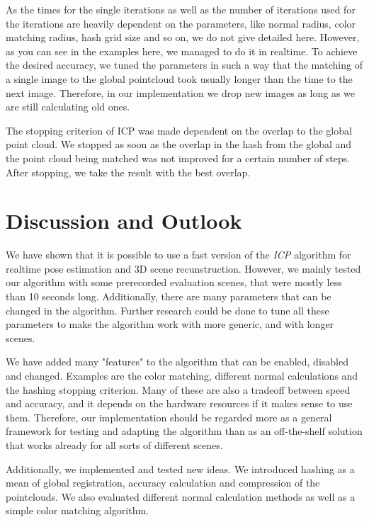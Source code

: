 \documentclass[10pt,twocolumn,letterpaper]{article}
\begin{document}
As the times for the single iterations as well as the number of iterations used for the iterations are heavily dependent on the parameters, like
normal radius, color matching radius, hash grid size and so on, we do not give detailed here. However, as you can see in the examples here, we managed
to do it in realtime. To achieve the desired accuracy, we tuned the parameters in such a way that the matching of a single image to the global pointcloud
took usually longer than the time to the next image. Therefore, in our implementation we drop new images as long as we are still calculating old ones.

The stopping criterion of ICP was made dependent on the overlap to the global point cloud. We stopped as soon as the overlap in the hash from the global
and the point cloud being matched was not improved for a certain number of steps. After stopping, we take the result with the best overlap.

\section{Discussion and Outlook}
We have shown that it is possible to use a fast version of the \textit{ICP} algorithm for realtime pose estimation and 3D scene recunstruction.
However, we mainly tested our algorithm with some prerecorded evaluation scenes, that were mostly less than 10 seconds long. Additionally,
there are many parameters that can be changed in the algorithm. Further research could be done to tune all these parameters to make the algorithm
work with more generic, and with longer scenes.

We have added many "features" to the algorithm that can be enabled, disabled and changed. Examples
are the color matching, different normal calculations and the hashing stopping criterion. Many of these are also a tradeoff between speed and
accuracy, and it depends on the hardware resources if it makes sense to use them. Therefore, our implementation should be regarded more
as a general framework for testing and adapting the algorithm than as an off-the-shelf solution that works already for all sorts of different scenes.

Additionally, we implemented and tested new ideas. We introduced hashing as a mean of global registration, accuracy calculation and compression
of the pointclouds. We also evaluated different normal calculation methods as well as a simple color matching algorithm.
\end{document}
